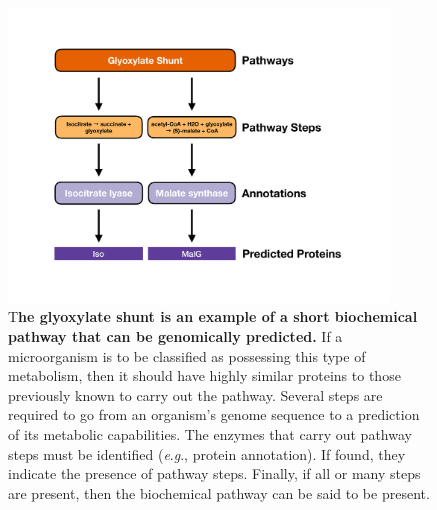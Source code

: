 \begin{figure}[!ht]
  \centering
	\includegraphics[width=0.9\textwidth]{media/pathway_analysis_steps.pdf}
	 \caption[The glyoxylate shunt is an example of a short biochemical pathway 
that can be genomically predicted.]{T\textbf{he glyoxylate shunt is an example 
of a short biochemical pathway that can be genomically predicted.} If a 
microorganism is to be classified as possessing this type of metabolism, then it 
should have highly similar proteins to those previously known to carry out the 
pathway. Several steps are required to go from an organism's genome sequence to 
a prediction of its metabolic capabilities. The enzymes that carry out pathway 
steps must be identified (\textit{e}.\textit{g}., protein annotation). If found, they indicate the 
presence of pathway steps. Finally, if all or many steps are present, then the 
biochemical pathway can be said to be present.}
	 \label{fig:pathway-analysis-steps}
\end{figure}

